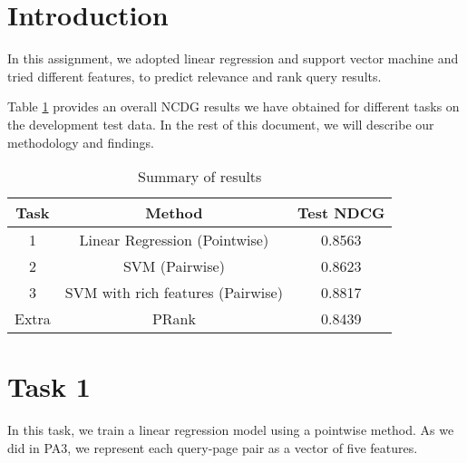 
\usepackage{graphicx,amssymb,amsmath,enumerate}
\usepackage{courier}
\usepackage{color}
\usepackage{listings}
\usepackage{fancyvrb}
\usepackage{stmaryrd}

\oddsidemargin 0in
\evensidemargin 0in
\textwidth 6.5in
\topmargin -0.5in
\textheight 9.0in




\pagestyle{myheadings}  %

\section*{Introduction}
In this assignment, we adopted linear regression and support vector machine and tried different features, to predict relevance and rank query results.

Table \ref{tab:all} provides an overall NCDG results we have obtained for different tasks on the development test data.
In the rest of this document, we will describe our methodology and findings.
\begin{table}[h!]
\begin{center}
\begin{tabular}{|c|c|c|}
  \hline
  Task & Method & Test NDCG \\\hline
  1 &  Linear Regression (Pointwise) & 0.8563 \\\hline
  2 & SVM (Pairwise)  & 0.8623 \\\hline
  3 & SVM with rich features (Pairwise)  & 0.8817 \\ \hline
  Extra & PRank & 0.8439   \\\hline
\end{tabular}
\caption{Summary of results}\label{tab:all}
\end{center}
\end{table}

\section*{Task 1}
In this task, we train a linear regression model using a pointwise method.
As we did in PA3, we represent each query-page pair as a vector of five features.

